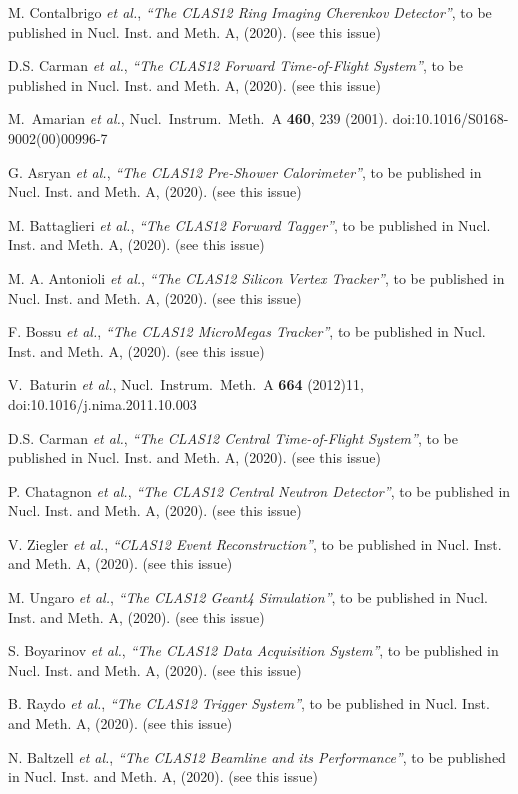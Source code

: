 \documentclass[final,3p,twocolumn]{elsarticle}
\begin{document}
\begin{thebibliography}{99}
M. Contalbrigo {\it et al.}, {\it ``The CLAS12 Ring Imaging Cherenkov Detector''}, to be published in Nucl. Inst.
and Meth. A, (2020). (see this issue)

D.S. Carman {\it et al.}, {\it ``The CLAS12 Forward Time-of-Flight System''}, to be published in Nucl. Inst.
and Meth. A, (2020). (see this issue)

  M.~Amarian {\it et al.},
  Nucl.\ Instrum.\ Meth.\ A {\bf 460}, 239 (2001).
  doi:10.1016/S0168-9002(00)00996-7

G. Asryan {\it et al.}, {\it ``The CLAS12 Pre-Shower Calorimeter''}, to be published in Nucl. Inst.
and Meth. A, (2020). (see this issue)

M. Battaglieri {\it et al.}, {\it ``The CLAS12 Forward Tagger''}, to be published in Nucl. Inst.
and Meth. A, (2020). (see this issue)

M. A. Antonioli {\it et al.}, {\it ``The CLAS12 Silicon Vertex Tracker''}, to be published in Nucl. Inst.
and Meth. A, (2020). (see this issue)

F. Bossu {\it et al.}, {\it ``The CLAS12 MicroMegas Tracker''}, to be published in Nucl. Inst.
and Meth. A, (2020). (see this issue)

  V.~Baturin {\it et al.},
  Nucl.\ Instrum.\ Meth.\ A {\bf 664} (2012)11, doi:10.1016/j.nima.2011.10.003

D.S. Carman {\it et al.}, {\it ``The CLAS12 Central Time-of-Flight System''}, to be published in Nucl. Inst.
and Meth. A, (2020). (see this issue)

P. Chatagnon {\it et al.}, {\it ``The CLAS12 Central Neutron Detector''}, to be published in Nucl. Inst.
and Meth. A, (2020). (see this issue)

V. Ziegler {\it et al.}, {\it ``CLAS12 Event Reconstruction''}, to be published in Nucl. Inst.
and Meth. A, (2020). (see this issue)

M. Ungaro {\it et al.}, {\it ``The CLAS12 Geant4 Simulation''}, to be published in Nucl. Inst.
and Meth. A, (2020). (see this issue)

S. Boyarinov {\it et al.}, {\it ``The CLAS12 Data Acquisition System''}, to be published in Nucl. Inst.
and Meth. A, (2020). (see this issue)

B. Raydo {\it et al.}, {\it ``The CLAS12 Trigger System''}, to be published in Nucl. Inst. and Meth. A, (2020).
(see this issue)

N. Baltzell {\it et al.}, {\it ``The CLAS12 Beamline and its Performance''}, to be published in Nucl. Inst.
and Meth. A, (2020). (see this issue)

\end{thebibliography}

\end{document}
